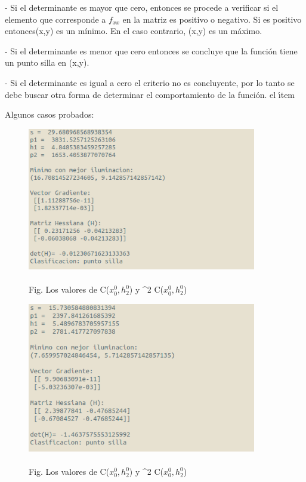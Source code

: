 \documentclass[11pt]{article}
\begin{document}
\begin{enumerate}
        \vspace{0.25cm}
        - Si el determinante es mayor que cero, entonces se procede a verificar si el elemento que corresponde a $f_{xx}$ en la matriz es positivo o negativo. Si es positivo entonces(x,y) es un mínimo. En el caso contrario, (x,y) es un máximo.
       
        \vspace{0.25cm}
        - Si el determinante es menor que cero entonces se concluye que la función tiene un punto silla en (x,y).
        
        \vspace{0.25cm}
        - Si el determinante es igual a cero el criterio no es concluyente, por lo tanto se debe buscar otra forma de determinar el comportamiento de la función. el ı́tem
        
        Algunos casos probados:
        
        \vspace{0.5cm}
        \begin{figure}[!h]
        	\includegraphics[keepaspectratio, width=10cm]{Imagenes/det1.png}
        	\caption{\\Fig. Los valores de \nabla C($x^0_0, h^0_2$) y \nabla^2 C($x^0_0, h^0_2$) \label{fig:grafica3}}
        \end{figure}
    
        \begin{figure}[!h]
        	\includegraphics[keepaspectratio, width=10cm]{Imagenes/det2.png}
        	\caption{\\Fig. Los valores de \nabla C($x^0_0, h^0_2$) y \nabla^2 C($x^0_0, h^0_2$)\label{fig:grafica3}}
        \end{figure}


\end{enumerate}
\end{document}
